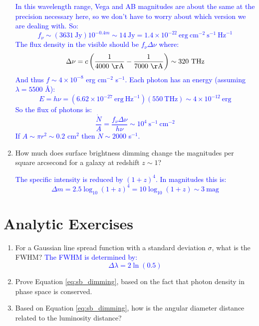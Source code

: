\begin{enumerate}
  \ifanswers
\textcolor{blue}{
In this wavelength range, Vega and AB magnitudes are about the same at
the precision necessary here, so we don't have to worry about which
version we are dealing with. So:
\begin{equation}
f_\nu \sim (3631 \mathrm{~Jy}) 10^{-0.4 m} \sim 14 \mathrm{~Jy} = 1.4 \times
10^{-22} \mathrm{~erg} \mathrm{~cm}^{-2} \mathrm{~s}^{-1} \mathrm{~Hz}^{-1}
\end{equation}
The flux density in the visible should be $f_\nu \Delta\nu$ where:
\begin{equation}
\Delta\nu = c \left(\frac{1}{4000 \mathrm{~\AA}} -
\frac{1}{7000 \mathrm{~\AA}}\right) \sim 320 \mathrm{~THz}
\end{equation}
And thus $f \sim 4\times 10^{-8}$ erg cm$^{-2}$ s$^{-1}$. Each photon
has an energy (assuming $\lambda = 5500$ \AA):
\begin{equation}
E = h\nu = (6.62\times
10^{-27} \mathrm{~erg~Hz}^{-1})( \mathrm{550~THz}) \sim 4 \times
10^{-12} \mathrm{~erg}
\end{equation}
So the flux of photons is:
\begin{equation}
\frac{\dot N}{A} = \frac{f_\nu \Delta\nu}{h\nu} \sim 
10^4 \mathrm{~s}^{-1} \mathrm{~cm}^{-2}
\end{equation}
If $A \sim \pi r^2 \sim 0.2$ cm$^2$ then $\dot N \sim 2000$ s$^{-1}$. 
}
 \fi

\item How much does surface brightness dimming change the magnitudes
  per square arcsecond for a galaxy at redshift $z\sim 1$?

  \ifanswers
\textcolor{blue}{
The specific intensity is reduced by $(1+z)^4$. In magnitudes this is:
\begin{equation}
\Delta m = 2.5 \log_{10} (1+z)^4 = 10 \log_{10} (1+z) \sim
3 \mathrm{~mag}
\end{equation}
}
\fi
\end{enumerate}   

\section{Analytic Exercises}

\begin{enumerate}
\item For a Gaussian line spread function with a standard deviation
  $\sigma$, what is the FWHM?
  \ifanswers
\textcolor{blue}{
The FWHM is determined by:
\begin{equation}
\Delta\lambda = 2  \ln(0.5)
\end{equation}
}
\fi
\item Prove Equation \ref{eq:sb_dimming}, based on the fact that
  photon density in phase space is conserved.
\item Based on Equation \ref{eq:sb_dimming}, how is the angular
  diameter distance related to the luminosity distance? 
\end{enumerate}

